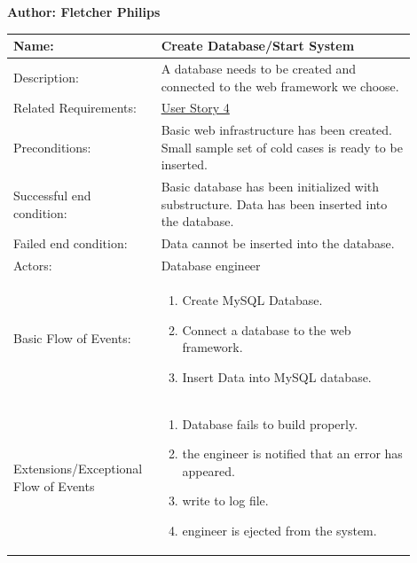 \documentclass[11pt]{article}
\begin{document}
\begin{table}[!ht]
\begin{center}
\textbf{Author: Fletcher Philips}
\vspace*{1em}

\begin{tabular}{p{0.30\linewidth}p{0.60\linewidth}}
	Name: & Create Database/Start System\\\hline
	Description: & A database needs to be created and connected to the web framework we choose.\\\hline
	Related Requirements:& \hyperlink{us4}{User Story 4}\\\hline
	Preconditions:& Basic web infrastructure has been created. Small sample set of cold cases is ready to be inserted.\\\hline
	Successful end condition:& Basic database has been initialized with substructure. Data has been inserted into the database.\\\hline
	Failed end condition:& Data cannot be inserted into the database.\\\hline
	Actors:& Database engineer\\\hline
	Basic Flow of Events: & \begin{enumerate}
	\item Create MySQL Database.
	\item Connect a database to the web framework.
	\item Insert Data into MySQL database.
	\end{enumerate}\\\hline
	Extensions/Exceptional Flow of Events & \begin{enumerate}
	\item Database fails to build properly.
	\item the engineer is notified that an error has appeared.
	\item write to log file.
	\item engineer is ejected from the system.
	\end{enumerate}
\end{tabular}
\label{des:create_database}	
\end{center}
\end{table}
\end{document}
